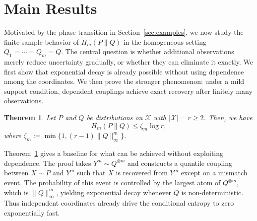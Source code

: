 \documentclass[journal]{IEEEtran}
\newtheorem{theorem}{Theorem}
\def\eps{\varepsilon}
\def\calX{{\mathcal X}}
\newcommand{\1}{\mathbf{1}}
\begin{document}
\section{Main Results}\label{sec:main}
Motivated by the phase transition in Section~\ref{sec:examples}, we now study
the finite-sample behavior of $H_m(P\|Q)$ in the homogeneous setting
$Q_1=\cdots=Q_m=Q$. The central question is whether additional observations
merely reduce uncertainty gradually, or whether they can eliminate it exactly.
We first show that exponential decay is already possible without using
dependence among the coordinates. We then prove the stronger phenomenon:
under a mild support condition, dependent couplings achieve exact recovery
after finitely many observations.

\begin{theorem}\label{thm:homogeneous-exp}
Let $P$ and $Q$ be distributions on $\calX$ with $|\mathcal X|=r\ge 2$. Then, we have 
\[H_m(P\|Q)\le \zeta_m \log r,\]
where $\zeta_m:=\min\{1,(r-1)\|Q\|_\infty^m\}$. 
\end{theorem}
Theorem~\ref{thm:homogeneous-exp} gives a baseline for what can be achieved
without exploiting dependence. The proof takes $Y^m\sim Q^{\otimes m}$ and
constructs a quantile coupling between $X\sim P$ and $Y^m$ such that $X$ is
recovered from $Y^m$ except on a mismatch event. The probability of this event
is controlled by the largest atom of $Q^{\otimes m}$, which is
$\|Q\|_\infty^m$, yielding exponential decay whenever $Q$ is non-deterministic.
Thus independent coordinates already drive the conditional entropy to zero
exponentially fast.
\end{document}
